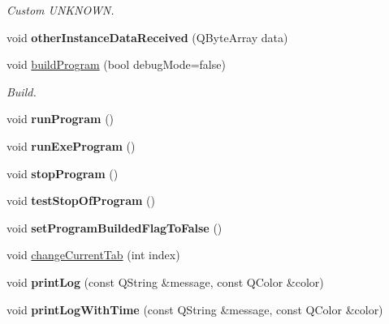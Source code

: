 \begin{DoxyCompactItemize}
\begin{DoxyCompactList}\small\item\em Custom U\+N\+K\+N\+O\+W\+N. \end{DoxyCompactList}\item 
\hypertarget{class_main_window_a1308c0af5f2cb446322065b02fcbeaad}{}void {\bfseries other\+Instance\+Data\+Received} (Q\+Byte\+Array data)\label{class_main_window_a1308c0af5f2cb446322065b02fcbeaad}

\item 
void \hyperlink{class_main_window_a8584b048711a7a4fd68c042aeaf6d8e7}{build\+Program} (bool debug\+Mode=false)
\begin{DoxyCompactList}\small\item\em Build. \end{DoxyCompactList}\item 
\hypertarget{class_main_window_a82e7f9602ec1cf314ccd79dd4ef55c20}{}void {\bfseries run\+Program} ()\label{class_main_window_a82e7f9602ec1cf314ccd79dd4ef55c20}

\item 
\hypertarget{class_main_window_a6e289e447311bfd223d971e20abd9117}{}void {\bfseries run\+Exe\+Program} ()\label{class_main_window_a6e289e447311bfd223d971e20abd9117}

\item 
\hypertarget{class_main_window_a0e2d100b79aa592b649f0f9a9e35076f}{}void {\bfseries stop\+Program} ()\label{class_main_window_a0e2d100b79aa592b649f0f9a9e35076f}

\item 
\hypertarget{class_main_window_af0402980c9360426d2c996ecdc7374de}{}void {\bfseries test\+Stop\+Of\+Program} ()\label{class_main_window_af0402980c9360426d2c996ecdc7374de}

\item 
\hypertarget{class_main_window_a45faac26bdff89812539c065ef018a18}{}void {\bfseries set\+Program\+Builded\+Flag\+To\+False} ()\label{class_main_window_a45faac26bdff89812539c065ef018a18}

\item 
void \hyperlink{class_main_window_aeac9a226959ae44a5f8eedb73fbfaa94}{change\+Current\+Tab} (int index)
\item 
\hypertarget{class_main_window_a44a8bbdd1b143683bea71cfbad3a11b4}{}void {\bfseries print\+Log} (const Q\+String \&message, const Q\+Color \&color)\label{class_main_window_a44a8bbdd1b143683bea71cfbad3a11b4}

\item 
\hypertarget{class_main_window_a7b6f8754dcab273fe524bcaa30e67604}{}void {\bfseries print\+Log\+With\+Time} (const Q\+String \&message, const Q\+Color \&color)\label{class_main_window_a7b6f8754dcab273fe524bcaa30e67604}


\end{DoxyCompactItemize}
